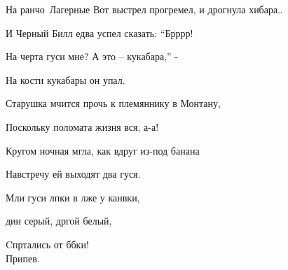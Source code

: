 \documentclass[11pt,a5paper]{book}
\begin{document}
\begin{song}{На ранчо}{}{~}{Лагерные}{}{}
Вот выстрел прогремел, и дрогнула хибара..\par
И Черный Билл едва успел сказать: “Брррр!\par
На черта гуси мне? А это – кукабара,” -\par
На кости кукабары он упал.\par
     Старушка мчится прочь к племяннику в Монтану,\par
     Поскольку поломата жизня вся, а-а!\par
     Кругом ночная мгла, как вдруг из-под банана \par
     Навстречу ей выходят два гуся.\par
Мли гуси лпки в лже у канвки,\par
{}дин серый, дргой белый,\par
Cпртались от ббки! \\
 
Припев.\\

\begin{SBSection*}
\begin{figure}[b!]
\end{figure}
\end{SBSection*}
\end{song}
\end{document}
